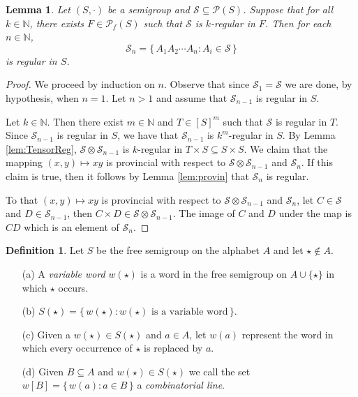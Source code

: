 \documentclass[12pt]{article}
\theoremstyle{plain}
\newtheorem{lem}[thm]{Lemma}
\theoremstyle{definition}
\newtheorem{defn}[thm]{Definition}
\newcommand{\bbN}{\mathbb{N}}
\newcommand{\calP}{\mathcal{P}}
\newcommand{\calS}{\mathcal{S}}
\newcommand{\Pf}{\mathcal{P}_f}
\begin{document}
\begin{lem}
  Let $(S, \cdot)$ be a semigroup and $\calS \subseteq \calP(S)$.
  Suppose that for all $k \in \bbN$, there exists $F \in \Pf(S)$ such
  that $\calS$ is \mbox{$k$-regular} in $F$.
  Then for each $n \in \bbN$,
  \[
    \calS_n = \{\, A_1A_2 \cdots A_n : A_i \in \calS \,\}
  \]
  is regular in $S$.
\end{lem}
\begin{proof}
  We proceed by induction on $n$. 
  Observe that since $\calS_1 = \calS$ we are done, by hypothesis,
  when $n = 1$.
  Let $n > 1$ and assume that $\calS_{n-1}$ is regular in $S$.

  Let $k \in \bbN$.
  Then there exist $m \in \bbN$ and $T \in [S]^m$ such that $\calS$ is
  regular in $T$.
  Since $\calS_{n-1}$ is regular in $S$, we have that $\calS_{n-1}$ is
  \mbox{$k^m$-regular} in $S$.
  By Lemma \ref{lem:TensorReg}, $\calS \otimes \calS_{n-1}$ is
  \mbox{$k$-regular} in $T \times S \subseteq S \times S$.
  We claim that the mapping $(x,y) \mapsto xy$ is provincial with
  respect to $\calS \otimes \calS_{n-1}$ and $\calS_n$. 
  If this claim is true, then it follows by Lemma \ref{lem:provin}
  that $\calS_n$ is regular.

  To that $(x,y) \mapsto xy$ is provincial with respect to $\calS
  \otimes \calS_{n-1}$ and $\calS_n$, let $C \in \calS$ and $D \in
  \calS_{n-1}$, then $C \times D \in \calS \otimes \calS_{n-1}$.
  The image of $C$ and $D$ under the map is $CD$ which is an element
  of $\calS_n$.
\end{proof}

\begin{defn}
  Let $S$ be the free semigroup on the alphabet $A$ and let $\star
  \not\in A$.
  \begin{itemize}
    \item[(a)] A \textsl{variable word} $w(\star)$ is a word in the
      free semigroup on $A \cup \{\star\}$ in which $\star$ occurs.

    \item[(b)] $S(\star) = \{\, w(\star) : \mbox{$w(\star)$ is a
        variable word} \,\}$.
    
    \item[(c)] Given a $w(\star) \in S(\star)$ and $a \in A$, let
      $w(a)$ represent the word in which every occurrence of $\star$
      is replaced by $a$.

    \item[(d)] Given $B \subseteq A$ and $w(\star) \in S(\star)$ we
      call the set $w[B] = \{\, w(a) : a \in B \,\}$ a
      \textsl{combinatorial line}.
  \end{itemize}
\end{defn}
\end{document}

